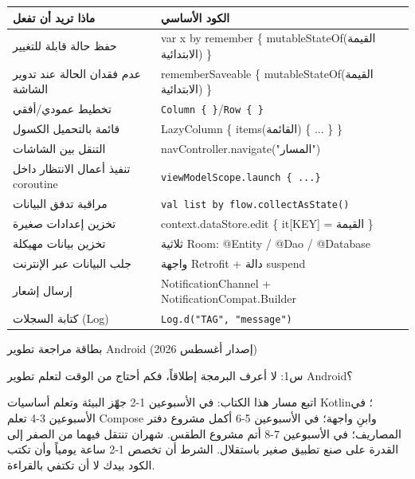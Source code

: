 


\begin{center}
\begin{tabularx}{\linewidth}{|X|X|}
\hline
\textbf{ماذا تريد أن تفعل} & \textbf{الكود الأساسي} \tabularnewline
\hline
حفظ حالة قابلة للتغيير & var x by remember \{ mutableStateOf(القيمة الابتدائية) \} \tabularnewline
عدم فقدان الحالة عند تدوير الشاشة & rememberSaveable \{ mutableStateOf(القيمة الابتدائية) \} \tabularnewline
تخطيط عمودي/أفقي & \texttt{Column \{ \}}/\texttt{Row \{ \}} \tabularnewline
قائمة بالتحميل الكسول & LazyColumn \{ items(القائمة) \{ ... \} \} \tabularnewline
التنقل بين الشاشات & navController.navigate("المسار") \tabularnewline
تنفيذ أعمال الانتظار داخل coroutine & \texttt{viewModelScope.\allowbreak launch \{ .\allowbreak .\allowbreak .\allowbreak  \}} \tabularnewline
مراقبة تدفق البيانات & \texttt{val list by flow.\allowbreak collectAsState()} \tabularnewline
تخزين إعدادات صغيرة & context.dataStore.edit \{ it[KEY] = القيمة \} \tabularnewline
تخزين بيانات مهيكلة & ثلاثية Room: @Entity / @Dao / @Database \tabularnewline
جلب البيانات عبر الإنترنت & واجهة Retrofit + دالة suspend \tabularnewline
إرسال إشعار & NotificationChannel + NotificationCompat.Builder \tabularnewline
كتابة السجلات (Log) & \texttt{Log.\allowbreak d("TAG", "message")} \tabularnewline
\hline
\end{tabularx}
\end{center}

\begin{center}\small\color{gray}بطاقة مراجعة تطوير Android (إصدار أغسطس 2026)\end{center}


س1: لا أعرف البرمجة إطلاقاً، فكم أحتاج من الوقت لتعلم تطوير Android؟

اتبع مسار هذا الكتاب: في الأسبوعين 1-2 جهّز البيئة وتعلم أساسيات Kotlin؛ في الأسبوعين 3-4 تعلم Compose وابنِ واجهة؛ في الأسبوعين 5-6 أكمل مشروع دفتر المصاريف؛ في الأسبوعين 7-8 أتم مشروع الطقس. شهران تنتقل فيهما من الصفر إلى القدرة على صنع تطبيق صغير باستقلال. الشرط أن تخصص 1-2 ساعة يومياً وأن تكتب الكود بيدك لا أن تكتفي بالقراءة.

